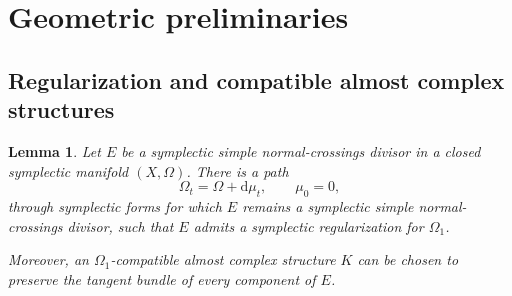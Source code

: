 \documentclass[11pt]{article}
\newtheorem{lemma}[theorem]{Lemma}
\theoremstyle{definition}
\theoremstyle{remark}
\newcommand{\dd}{\mathrm d}
\begin{document}

\section{Geometric preliminaries}

\subsection{Regularization and compatible almost complex structures}

\begin{lemma}\label{lem:regularization}
Let $E$ be a symplectic simple normal-crossings divisor in a closed
symplectic manifold $(X,\Omega)$.  There is a path
\[
\Omega_t=\Omega+\dd\mu_t,\qquad \mu_0=0,
\]
through symplectic forms for which $E$ remains a symplectic simple
normal-crossings divisor, such that $E$ admits a symplectic
regularization for $\Omega_1$.

Moreover, an $\Omega_1$-compatible almost complex structure $K$ can
be chosen to preserve the tangent bundle of every component of $E$.
\end{lemma}
\end{document}
